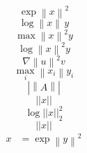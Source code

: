\documentclass{article}
\begin{document}
\[ \exp\left\|x\right\|^2 \]
\[ \log\left\|x\right\|\,y \]
\[ \max\left\|x\right\|^2 y \]
\[ \log\left\lVert x\right\rVert^2 y \]
\[ \nabla\left\|u\right\|^2 v \]
\[ \max_i\left\|x_i\right\|y_i \]
\[ \left|\!\left\|A\right\|\!\right| \]
\[ \left|\left|x\right|\right| \]
\[ \log\left|\left|x\right|\right|_{2}^{2} \]
\[ \left\lvert\left\lvert x\right\rvert\right\rvert \]
\begin{equation}\begin{split}x&=\exp\left\|y\right\|^2\end{split}\end{equation}
\end{document}
